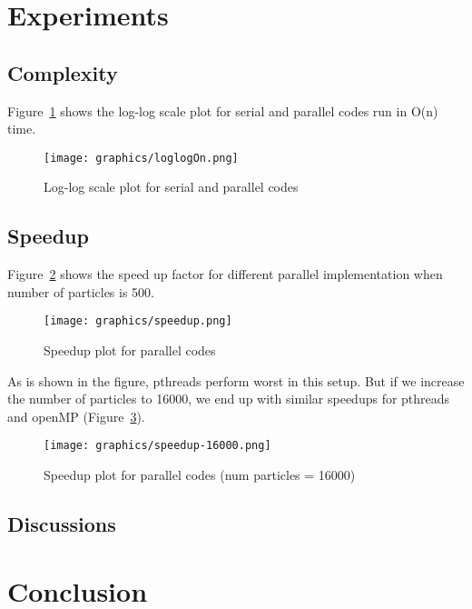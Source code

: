 \documentclass[11pt]{article}
\begin{document}
\section{Experiments}
\subsection{Complexity}
Figure~\ref{fig:loglogOn} shows the log-log scale plot for serial and parallel codes run in O(n) time.

\begin{figure}[htb]
  \centering
  \texttt{[image: graphics/loglogOn.png]}
  \caption{Log-log scale plot for serial and parallel codes}
  \label{fig:loglogOn}
\end{figure}

\subsection{Speedup}
Figure~\ref{fig:speedup} shows the speed up factor for different parallel implementation when number of particles is 500.
\begin{figure}[htb]
  \centering
  \texttt{[image: graphics/speedup.png]}
  \caption{Speedup plot for parallel codes}
  \label{fig:speedup}
\end{figure}
As is shown in the figure, pthreads perform worst in this setup. But if we increase the number of particles to 16000,
we end up with similar speedups for pthreads and openMP (Figure~\ref{fig:speedup-16000}).
\begin{figure}[htb]
  \centering
  \texttt{[image: graphics/speedup-16000.png]}
  \caption{Speedup plot for parallel codes (num particles = 16000)}
  \label{fig:speedup-16000}
\end{figure}

\subsection{Discussions}

\section{Conclusion}




\end{document}

